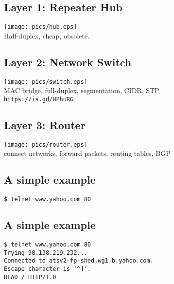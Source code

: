\documentclass[xga]{xdvislides}
\begin{document}
\subsection{Layer 1: Repeater Hub}
\vspace*{\fill}
\begin{center}
	\texttt{[image: pics/hub.eps]} \\
	Half-duplex, cheap, obsolete.
\end{center}
\vspace*{\fill}

\subsection{Layer 2: Network Switch}
\vspace*{\fill}
\begin{center}
	\texttt{[image: pics/switch.eps]} \\
	MAC bridge, full-duplex, segmentation, CIDR, STP \\
	\verb+https://is.gd/HPhuRG+
\end{center}
\vspace*{\fill}

\subsection{Layer 3: Router}
\vspace*{\fill}
\begin{center}
	\texttt{[image: pics/router.eps]} \\
	connect networks, forward packets, routing tables, BGP
\end{center}
\vspace*{\fill}

\subsection{A simple example}
\Hugesize
\begin{center}
\begin{verbatim}
$ telnet www.yahoo.com 80

\end{verbatim}
\end{center}
\Normalsize
\vspace*{\fill}

\subsection{A simple example}
\Hugesize
\begin{center}
\begin{verbatim}
$ telnet www.yahoo.com 80
Trying 98.138.219.232...
Connected to atsv2-fp-shed.wg1.b.yahoo.com.
Escape character is '^]'.
HEAD / HTTP/1.0

\end{verbatim}
\end{center}
\Normalsize
\vspace*{\fill}
\end{document}
